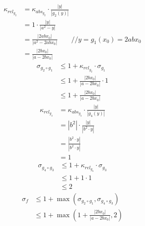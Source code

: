 \documentclass{llncs}
\begin{document}
\begin{align*}
\kappa_{rel_{g_2}}
&= \kappa_{abs_{g_2}} \cdot \frac{|y|}{|g_2(y)|}\\
&= 1 \cdot \frac{|y|}{|a^2-y|}\\
&=\frac{|2abx_0|}{|a^2-2abx_0|} \quad\quad // y=g_1(x_0)=2abx_0\\
&=\frac{|2bx_0|}{|a-2bx_0|}
\end{align*}
\begin{align*}
\sigma_{g_2\circ g_1}
&\le 1 + \kappa_{rel_{g_2}} \cdot \sigma_{g_1}\\
&\le 1 + \frac{|2bx_0|}{|a-2bx_0|} \cdot 1\\
&\le 1 + \frac{|2bx_0|}{|a-2bx_0|} 
\end{align*}
\begin{align*}
\kappa_{rel_{g_4}}
&= \kappa_{abs_{g_4}} \cdot \frac{|y|}{|g_4(y)|}\\
&= |b^2| \cdot \frac{|y|}{|b^2\cdot y|}\\
&=\frac{|b^2\cdot y|}{|b^2\cdot y|} \\
&=1
\end{align*}
\begin{align*}
\sigma_{g_4\circ g_3}
&\le 1 + \kappa_{rel_{g_4}} \cdot \sigma_{g_3}\\
&\le 1 + 1 \cdot 1\\
&\le 2 
\end{align*}
\begin{align*}
\sigma_{f}
&\le 1 + \max (\sigma_{g_2\circ g_1},\sigma_{g_4\circ g_3})\\
&\le 1 + \max (1 + \frac{|2bx_0|}{|a-2bx_0|},2)
\end{align*}
\newpage
\end{document}
